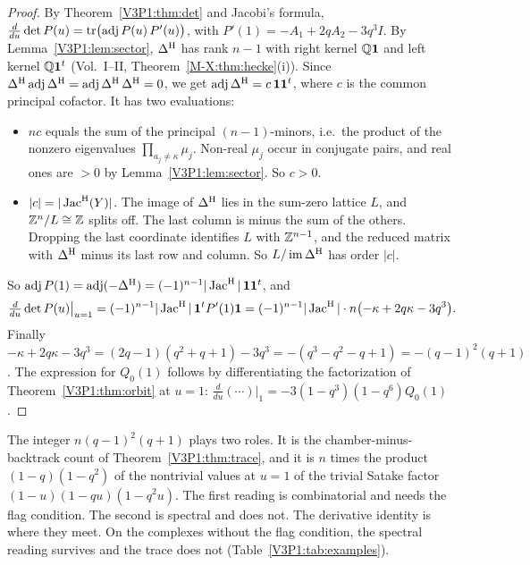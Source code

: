 \begin{proof}
By Theorem~\ref{V3P1:thm:det} and Jacobi's formula,
$\frac{d}{du}\det P(u)=\operatorname{tr}\bigl(\operatorname{adj} P(u)\,P'(u)\bigr)$, with
$P'(1)=-A_1+2qA_2-3q^{3}I$. By Lemma~\ref{V3P1:lem:sector}, $\Delta^{\mathrm{H}}$ has rank $n-1$ with
right kernel $\mathbb{Q}\mathbf 1$ and left kernel $\mathbb{Q}\mathbf 1^{t}$ (Vol.~I--II, Theorem~\ref{M-X:thm:hecke}(i)).
Since $\Delta^{\mathrm{H}}\operatorname{adj}\Delta^{\mathrm{H}}=\operatorname{adj}\Delta^{\mathrm{H}}\,\Delta^{\mathrm{H}}=0$, we get $\operatorname{adj}\Delta^{\mathrm{H}}=c\,\mathbf 1\mathbf 1^{t}$,
where $c$ is the common principal cofactor. It has two evaluations:
\begin{itemize}
\item $nc$ equals the sum of the principal $(n-1)$-minors, i.e.\ the product of the nonzero
eigenvalues $\prod_{a_j\neq\kappa}\mu_j$. Non-real $\mu_j$ occur in conjugate pairs, and real
ones are $>0$ by Lemma~\ref{V3P1:lem:sector}. So $c>0$.
\item $|c|=|\operatorname{Jac}^{\mathrm{H}}(Y)|$. The image of $\Delta^{\mathrm{H}}$ lies in the sum-zero lattice $L$, and
$\mathbb{Z}^{n}/L\cong\mathbb{Z}$ splits off. The last column is minus the sum of the others. Dropping the
last coordinate identifies $L$ with $\mathbb{Z}^{n-1}$, and the reduced matrix with $\Delta^{\mathrm{H}}$ minus
its last row and column. So $L/\operatorname{im}\Delta^{\mathrm{H}}$ has order $|c|$.
\end{itemize}
So $\operatorname{adj} P(1)=\operatorname{adj}(-\Delta^{\mathrm{H}})=(-1)^{n-1}|\operatorname{Jac}^{\mathrm{H}}|\,\mathbf 1\mathbf 1^{t}$, and
\[
\tfrac{d}{du}\det P(u)\big|_{u=1}=(-1)^{n-1}|\operatorname{Jac}^{\mathrm{H}}|\,\mathbf 1^{t}P'(1)\mathbf 1
=(-1)^{n-1}|\operatorname{Jac}^{\mathrm{H}}|\cdot n\bigl(-\kappa+2q\kappa-3q^{3}\bigr).
\]
Finally $-\kappa+2q\kappa-3q^{3}=(2q-1)(q^{2}+q+1)-3q^{3}=-(q^{3}-q^{2}-q+1)=-(q-1)^{2}(q+1)$.
The expression for $Q_0(1)$ follows by differentiating the factorization of
Theorem~\ref{V3P1:thm:orbit} at $u=1$:
$\frac{d}{du}(\cdots)|_{1}=-3(1-q^{3})(1-q^{6})Q_0(1)$.
\end{proof}

\begin{remark}\label{V3P1:rem:coincidence}
The integer $n(q-1)^{2}(q+1)$ plays two roles. It is the chamber-minus-backtrack count of
Theorem~\ref{V3P1:thm:trace}, and it is $n$ times the product $(1-q)(1-q^{2})$ of the
nontrivial values at $u=1$ of the trivial Satake factor $(1-u)(1-qu)(1-q^{2}u)$. The first
reading is combinatorial and needs the flag condition. The second is spectral and does not.
The derivative identity is where they meet. On the complexes without the flag condition, the
spectral reading survives and the trace does not (Table~\ref{V3P1:tab:examples}).
\end{remark}

